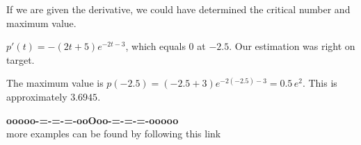 \documentclass{ximera}
\begin{document}
If we are given the derivative, we could have determined the critical number and maximum value.


$p'(t) = -(2t+5) e^{-2t-3}$, which equals $0$ at $-2.5$.  Our estimation was right on target.  

The maximum value is $p(-2.5) = (-2.5+3)e^{-2(-2.5)-3} = 0.5 \, e^{2}$.  This is approximately $3.6945$.


































\begin{center}
\textbf{\textcolor{green!50!black}{ooooo-=-=-=-ooOoo-=-=-=-ooooo}} \\

more examples can be found by following this link\\ 

\end{center}
\end{document}
